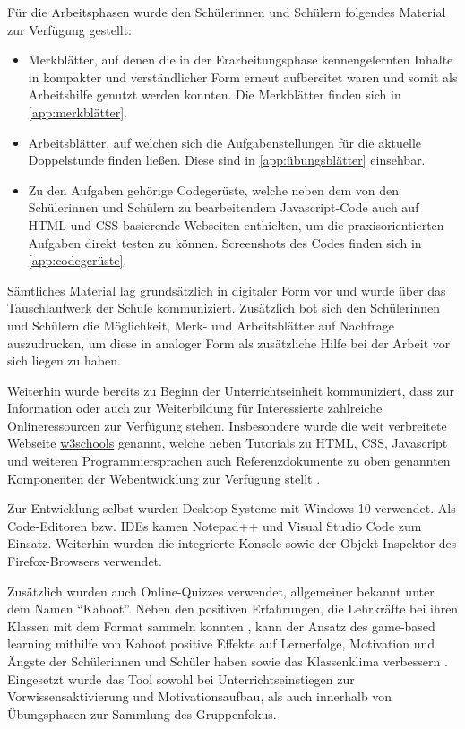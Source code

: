 Für die Arbeitsphasen wurde den Schülerinnen und Schülern folgendes Material zur Verfügung gestellt:
\begin{itemize}
	\item Merkblätter, auf denen die in der Erarbeitungsphase kennengelernten Inhalte in kompakter und verständlicher Form erneut aufbereitet waren und somit als Arbeitshilfe genutzt werden konnten.
	Die Merkblätter finden sich in \autoref{app:merkblätter}.
	\item Arbeitsblätter, auf welchen sich die Aufgabenstellungen für die aktuelle Doppelstunde finden ließen.
	Diese sind in \autoref{app:übungsblätter} einsehbar.
	\item Zu den Aufgaben gehörige Codegerüste, welche neben dem von den Schülerinnen und Schülern zu bearbeitendem Javascript-Code auch auf HTML und CSS basierende Webseiten enthielten, um die praxisorientierten Aufgaben direkt testen zu können.
	Screenshots des Codes finden sich in \autoref{app:codegerüste}.
\end{itemize}
Sämtliches Material lag grundsätzlich in digitaler Form vor und wurde über das Tauschlaufwerk der Schule kommuniziert.
Zusätzlich bot sich den Schülerinnen und Schülern die Möglichkeit, Merk- und Arbeitsblätter auf Nachfrage auszudrucken, um diese in analoger Form als zusätzliche Hilfe bei der Arbeit vor sich liegen zu haben.

Weiterhin wurde bereits zu Beginn der Unterrichtseinheit kommuniziert, dass zur Information oder auch zur Weiterbildung für Interessierte zahlreiche Onlineressourcen zur Verfügung stehen.
Insbesondere wurde die weit verbreitete Webseite \href{https://www.w3schools.com}{w3schools} genannt, welche neben Tutorials zu HTML, CSS, Javascript und weiteren Programmiersprachen auch Referenzdokumente zu oben genannten Komponenten der Webentwicklung zur Verfügung stellt \cite{w3schools}.

Zur Entwicklung selbst wurden Desktop-Systeme mit Windows 10 verwendet.
Als Code-Editoren bzw. IDEs kamen Notepad++ \cite{ho2021notepad++} und Visual Studio Code \cite{microsoft2024vscode} zum Einsatz.
Weiterhin wurden die integrierte Konsole sowie der Objekt-Inspektor des Firefox-Browsers verwendet.

Zusätzlich wurden auch Online-Quizzes verwendet, allgemeiner bekannt unter dem Namen ``Kahoot''.
Neben den positiven Erfahrungen, die Lehrkräfte bei ihren Klassen mit dem Format sammeln konnten \cite{dellos2015kahoot}, kann der Ansatz des game-based learning mithilfe von Kahoot positive Effekte auf Lernerfolge, Motivation und Ängste der Schülerinnen und Schüler haben sowie das Klassenklima verbessern \cite{wang2020kahoot}.
Eingesetzt wurde das Tool sowohl bei Unterrichtseinstiegen zur Vorwissensaktivierung und Motivationsaufbau, als auch innerhalb von Übungsphasen zur Sammlung des Gruppenfokus.